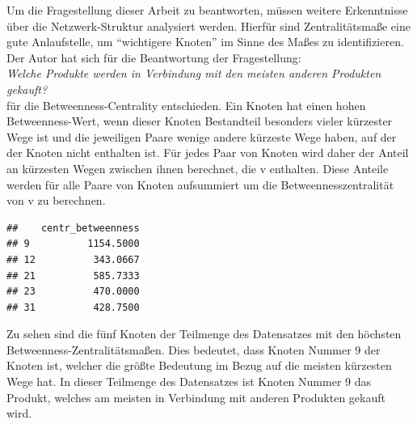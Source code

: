 \documentclass[
  12 pt,
]{article}
\newenvironment{Shaded}{\begin{snugshade}}{\end{snugshade}}
\newcommand{\CommentTok}[1]{\textcolor[rgb]{0.56,0.35,0.01}{\textit{#1}}}
\newcommand{\DataTypeTok}[1]{\textcolor[rgb]{0.13,0.29,0.53}{#1}}
\newcommand{\DecValTok}[1]{\textcolor[rgb]{0.00,0.00,0.81}{#1}}
\newcommand{\KeywordTok}[1]{\textcolor[rgb]{0.13,0.29,0.53}{\textbf{#1}}}
\newcommand{\NormalTok}[1]{#1}
\newcommand{\OperatorTok}[1]{\textcolor[rgb]{0.81,0.36,0.00}{\textbf{#1}}}
\newcommand{\OtherTok}[1]{\textcolor[rgb]{0.56,0.35,0.01}{#1}}
\newcommand{\StringTok}[1]{\textcolor[rgb]{0.31,0.60,0.02}{#1}}
\begin{document}
Um die Fragestellung dieser Arbeit zu beantworten, müssen weitere
Erkenntnisse über die Netzwerk-Struktur analysiert werden. Hierfür sind
Zentralitätsmaße eine gute Anlaufstelle, um ``wichtigere Knoten'' im
Sinne des Maßes zu identifizieren. Der Autor hat sich für die
Beantwortung der Fragestellung:\\
\emph{Welche Produkte werden in Verbindung mit den meisten anderen
Produkten gekauft?}\\
für die Betweenness-Centrality entschieden. Ein Knoten hat einen hohen
Betweenness-Wert, wenn dieser Knoten Bestandteil besonders vieler
kürzester Wege ist und die jeweiligen Paare wenige andere kürzeste Wege
haben, auf der der Knoten nicht enthalten ist. Für jedes Paar von Knoten
wird daher der Anteil an kürzesten Wegen zwischen ihnen berechnet, die v
enthalten. Diese Anteile werden für alle Paare von Knoten aufsummiert um
die Betweennesszentralität von v zu berechnen.

\begin{Shaded}
\end{Shaded}

\begin{verbatim}
##    centr_betweenness
## 9          1154.5000
## 12          343.0667
## 21          585.7333
## 23          470.0000
## 31          428.7500
\end{verbatim}

Zu sehen sind die fünf Knoten der Teilmenge des Datensatzes mit den
höchsten Betweenness-Zentralitätsmaßen. Dies bedeutet, dass Knoten
Nummer 9 der Knoten ist, welcher die größte Bedeutung im Bezug auf die
meisten kürzesten Wege hat. In dieser Teilmenge des Datensatzes ist
Knoten Nummer 9 das Produkt, welches am meisten in Verbindung mit
anderen Produkten gekauft wird.
\end{document}
